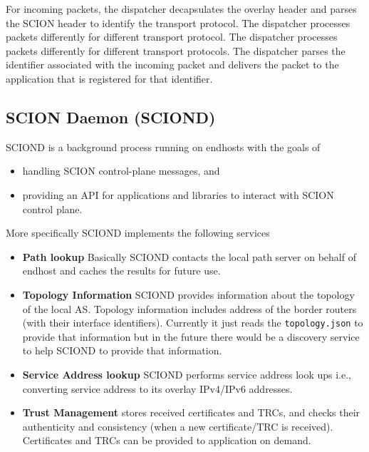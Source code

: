 For incoming packets, the dispatcher decapsulates the overlay header and parses the SCION header to identify the transport protocol. The dispatcher processes packets differently for different transport protocol. The dispatcher processes packets differently for different transport protocols. The dispatcher parses the identifier associated with the incoming packet and delivers the packet to the application that is registered for that identifier.

\subsection{SCION Daemon (SCIOND)} \label{background:sciond}
SCIOND is a background process running on endhosts with the goals of
\begin{itemize}
    \item handling SCION control-plane messages, and
    \item providing an API for applications and libraries to interact with SCION control plane.
\end{itemize}
More specifically SCIOND implements the following services
\begin{itemize}
    \item \textbf{Path lookup} Basically SCIOND contacts the local path server on behalf of endhost and caches the results for future use.
    \item \textbf{Topology Information} SCIOND provides information about the topology of the local AS. Topology information includes address of the border routers (with their interface identifiers). Currently it just reads the \texttt{topology.json} to provide that information but in the future there would be a discovery service to help SCIOND to provide that information.
    \item \textbf{Service Address lookup} SCIOND performs service address look ups i.e., converting service address to its overlay IPv4/IPv6 addresses.
    \item \textbf{Trust Management} stores received certificates and TRCs, and checks their authenticity and consistency (when a new certificate/TRC is received). Certificates and TRCs can be provided to application on demand.
\end{itemize}

